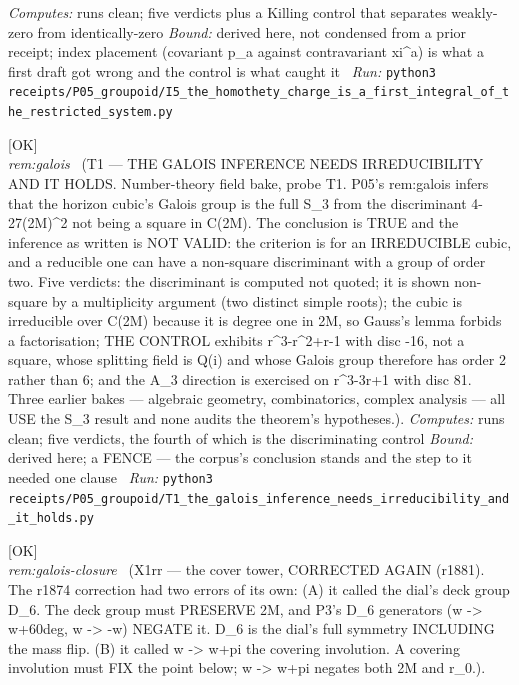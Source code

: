 \begin{description}
\emph{Computes:} runs clean; five verdicts plus a Killing control that separates weakly-zero from identically-zero
 \emph{Bound:} derived here, not condensed from a prior receipt; index placement (covariant p\_a against contravariant xi\textasciicircum{}a) is what a first draft got wrong and the control is what caught it
\ \emph{Run:} \texttt{python3 receipts/P05\_groupoid/I5\_the\_homothety\_charge\_is\_a\_first\_integral\_of\_the\_restricted\_system.py}
\item[\rcptlabel{T1_the_galois_inference_needs_irreducibility_and_it_holds}{P5R13}\textbf{P5R13}\quad\texttt{T1\_the\_galois\_inference\_needs\_irreducibility\_and\_it\_holds}]\hfill\textsf{[OK]}\\
\textit{rem:galois} \ (T1 --- THE GALOIS INFERENCE NEEDS IRREDUCIBILITY AND IT HOLDS. Number-theory field bake, probe T1. P05's rem:galois infers that the horizon cubic's Galois group is the full S\_3 from the discriminant 4-27(2M)\textasciicircum{}2 not being a square in C(2M). The conclusion is TRUE and the inference as written is NOT VALID: the criterion is for an IRREDUCIBLE cubic, and a reducible one can have a non-square discriminant with a group of order two. Five verdicts: the discriminant is computed not quoted; it is shown non-square by a multiplicity argument (two distinct simple roots); the cubic is irreducible over C(2M) because it is degree one in 2M, so Gauss's lemma forbids a factorisation; THE CONTROL exhibits r\textasciicircum{}3-r\textasciicircum{}2+r-1 with disc -16, not a square, whose splitting field is Q(i) and whose Galois group therefore has order 2 rather than 6; and the A\_3 direction is exercised on r\textasciicircum{}3-3r+1 with disc 81. Three earlier bakes --- algebraic geometry, combinatorics, complex analysis --- all USE the S\_3 result and none audits the theorem's hypotheses.). 
\emph{Computes:} runs clean; five verdicts, the fourth of which is the discriminating control
 \emph{Bound:} derived here; a FENCE --- the corpus's conclusion stands and the step to it needed one clause
\ \emph{Run:} \texttt{python3 receipts/P05\_groupoid/T1\_the\_galois\_inference\_needs\_irreducibility\_and\_it\_holds.py}
\item[\rcptlabel{X1rr_sky_angle_is_the_galois_closure}{P5R14}\textbf{P5R14}\quad\texttt{X1rr\_sky\_angle\_is\_the\_galois\_closure}]\hfill\textsf{[OK]}\\
\textit{rem:galois-closure} \ (X1rr --- the cover tower, CORRECTED AGAIN (r1881). The r1874 correction had two errors of its own: (A) it called the dial's deck group D\_6. The deck group must PRESERVE 2M, and P3's D\_6 generators (w -> w+60deg, w -> -w) NEGATE it. D\_6 is the dial's full symmetry INCLUDING the mass flip. (B) it called w -> w+pi the covering involution. A covering involution must FIX the point below; w -> w+pi negates both 2M and r\_0.). 

\end{description}
